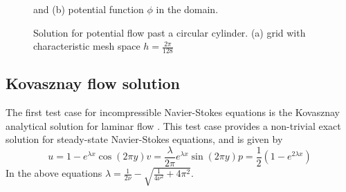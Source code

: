 \documentclass[final,3p,review]{elsarticle}
\begin{document}
  	\begin{figure}[h]
  		\centering
  		\begin{subfigure}{0.45\textwidth}
  		\centering
  		\caption{}
  		\end{subfigure}
  		\begin{subfigure}{0.51\textwidth}
  			\centering
			\caption{}
		\end{subfigure}
		
		\caption{Solution for potential flow past a circular cylinder. (a) grid with characteristic mesh space $h = \frac{2\pi}{128}$} and (b) potential function $\phi$ in the domain.
		\label{fig:potential_flow}
  	\end{figure}

    	
	\subsection{Kovasznay flow solution}
	\noindent The first test case for incompressible Navier-Stokes equations is the Kovasznay analytical solution for laminar flow \cite{Kovasznay_1948}. This test case provides a non-trivial exact solution for steady-state Navier-Stokes equations, and is given by 
	\begin{subequations}
		\begin{equation}
			u = 1 - e^{\lambda x} \cos (2\pi y)
		\end{equation}
		\begin{equation}
			v = \frac{\lambda}{2\pi} e^{\lambda x} \sin(2\pi y)
		\end{equation}
		\begin{equation}
			p = \frac{1}{2}(1 - e^{2\lambda x})
		\end{equation}
		\label{eq:kovasznay_flow}
	\end{subequations}
	In the above equations $\lambda = \frac{1}{2\nu} - \sqrt{\frac{1}{4\nu^2} + 4\pi^2}$. 
	
\end{document}
